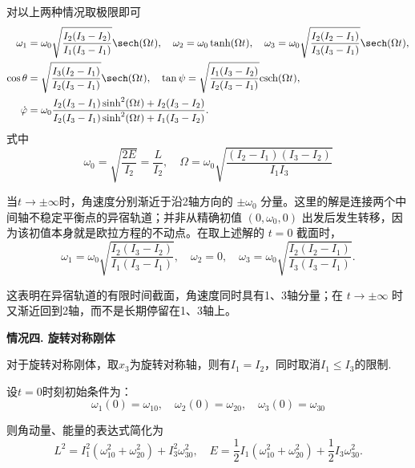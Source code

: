 对以上两种情况取极限即可
\begin{align*}
	\omega_1      & = \omega_0\sqrt{\frac{I_2(I_3-I_2)}{I_1(I_3-I_1)}}\sech(\Omega t) ,\quad
	\omega_2 = \omega_0\tanh(\Omega t) ,\quad
	\omega_3 = \omega_0\sqrt{\frac{I_2(I_2-I_1)}{I_3(I_3-I_1)}}\sech(\Omega t),                                              \\
	\cos\theta    & = \sqrt{\frac{I_3(I_2-I_1)}{I_2(I_3-I_1)}}\sech(\Omega t) ,\quad
	\tan\psi = \sqrt{\frac{I_1(I_3-I_2)}{I_2(I_3-I_1)}}\mathrm{csch}(\Omega t) ,                                             \\
	\dot{\varphi} & = \omega_0\frac{I_2(I_3-I_1)\sinh^2(\Omega t)+I_2(I_3-I_2)}{I_2(I_3-I_1)\sinh^2(\Omega t)+I_1(I_3-I_2)}.
\end{align*}
式中
\begin{equation*}
	\omega_0 = \sqrt{\frac{2E}{I_2}} = \frac{L}{I_2},\quad \Omega = \omega_0\sqrt{\frac{(I_2-I_1)(I_3-I_2)}{I_1I_3}}
\end{equation*}

当\(t \to \pm\infty\)时，角速度分别渐近于沿2轴方向的 \(\pm\omega_0\) 分量。这里的解是连接两个中间轴不稳定平衡点的异宿轨道；并非从精确初值 \((0,\omega_0,0)\) 出发后发生转移，因为该初值本身就是欧拉方程的不动点。在取上述解的 \(t=0\) 截面时，
\begin{equation*}
	\omega_1= \omega_0 \sqrt{\frac{I_2(I_3-I_2)}{I_1(I_3-I_1)}} ,\quad
	\omega_2 = 0 ,\quad
	\omega_3 = \omega_0 \sqrt{\frac{I_2(I_2-I_1)}{I_3(I_3-I_1)}}.
\end{equation*}

这表明在异宿轨道的有限时间截面，角速度同时具有1、3轴分量；在 \(t\to\pm\infty\) 时又渐近回到2轴，而不是长期停留在1、3轴上。

\textbf{情况四. 旋转对称刚体}

对于旋转对称刚体，取\(x_3\)为旋转对称轴，则有\(I_1 = I_2\)，同时取消\(I_1 \leq I_3\)的限制.

设\(t=0\)时刻初始条件为：
\begin{equation*}
	\omega_1(0) = \omega_{10}, \quad \omega_2(0) = \omega_{20}, \quad \omega_3(0) = \omega_{30}
\end{equation*}

则角动量、能量的表达式简化为
\begin{equation*}
	L^2 = I_1^2(\omega_{10}^2 + \omega_{20}^2) + I_3^2\omega_{30}^2 ,\quad
	E = \frac{1}{2}I_1(\omega_{10}^2 + \omega_{20}^2) + \frac{1}{2}I_3\omega_{30}^2.
\end{equation*}

